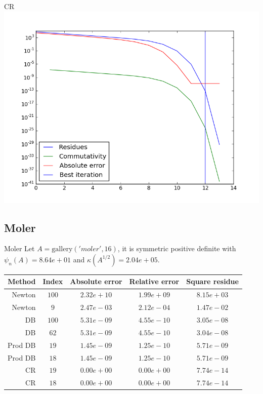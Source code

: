 \documentclass{beamer}
\theoremstyle{plain}
\theoremstyle{definition}
\theoremstyle{remark}
\begin{document}
\begin{frame}{CR}
  \includegraphics[width=\textwidth,height=\textheight]{"e1/CR - absplot"}
\end{frame}

\subsection{Moler}

\begin{frame}{Moler}
  Let $A = \mathrm{gallery}('moler',16)$, it is symmetric positive
  definite with $\psi_n(A) = 8.64e+01$ and $\kappa(A^{1/2}) = 2.04e+05$.

  \begin{tabular}{r| c c c c}
    Method & Index & Absolute error & Relative error & Square residue \\
    \hline
    Newton & $100$ & $2.32e+10$ & $1.99e+09$ & $8.15e+03$ \\
    Newton & $9$ & $2.47e-03$ & $2.12e-04$ & $1.47e-02$ \\
    \hline
    DB & $100$ & $5.31e-09$ & $4.55e-10$ & $3.05e-08$ \\
    DB & $62$ & $5.31e-09$ & $4.55e-10$ & $3.04e-08$ \\
    \hline
    Prod DB & $19$ & $1.45e-09$ & $1.25e-10$ & $5.71e-09$ \\
    Prod DB & $18$ & $1.45e-09$ & $1.25e-10$ & $5.71e-09$ \\
    \hline
    CR & $19$ & $0.00e+00$ & $0.00e+00$ & $7.74e-14$ \\
    CR & $18$ & $0.00e+00$ & $0.00e+00$ & $7.74e-14$ \\
  \end{tabular}  
\end{frame}
\end{document}
